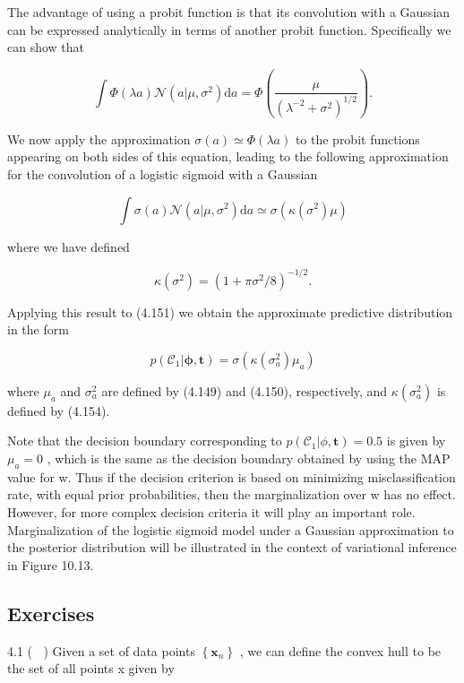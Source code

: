 \documentclass[
  10
]{article}
\begin{document}
The advantage of using a probit function is that its convolution with a
Gaussian can be expressed analytically in terms of another probit
function. Specifically we can show that

\[
\int \Phi (\lambda a) \mathcal {N} (a | \mu , \sigma^ {2}) \mathrm{d} a = \Phi \left(\frac {\mu}{(\lambda^ {- 2} + \sigma^ {2}) ^ {1 / 2}}\right).\tag{4.152}
\]

We now apply the approximation
\(\sigma ( a ) \simeq \Phi ( \lambda a )\) to the probit functions
appearing on both sides of this equation, leading to the following
approximation for the convolution of a logistic sigmoid with a Gaussian

\[
\int \sigma (a) \mathcal {N} (a | \mu , \sigma^ {2}) \mathrm{d} a \simeq \sigma (\kappa (\sigma^ {2}) \mu)\tag{4.153}
\]

where we have defined

\[
\kappa (\sigma^ {2}) = (1 + \pi \sigma^ {2} / 8) ^ {- 1 / 2}.\tag{4.154}
\]

Applying this result to (4.151) we obtain the approximate predictive
distribution in the form

\[
p (\mathcal {C} _ {1} | \boldsymbol {\phi}, \mathbf {t}) = \sigma \left(\kappa (\sigma_ {a} ^ {2}) \mu_ {a}\right)\tag{4.155}
\]

where \(\mu _ { a }\) and \(\sigma _ { a } ^ { 2 }\) are defined by
(4.149) and (4.150), respectively, and
\(\kappa ( \sigma _ { a } ^ { 2 } )\) is defined by (4.154).

Note that the decision boundary corresponding to
\(p ( \mathcal { C } _ { 1 } | \phi , \mathbf { t } ) = 0 . 5\) is given
by \(\mu _ { a } = 0\) , which is the same as the decision boundary
obtained by using the MAP value for w. Thus if the decision criterion is
based on minimizing misclassification rate, with equal prior
probabilities, then the marginalization over w has no effect. However,
for more complex decision criteria it will play an important role.
Marginalization of the logistic sigmoid model under a Gaussian
approximation to the posterior distribution will be illustrated in the
context of variational inference in Figure 10.13.

\subsection{Exercises}\label{exercises}

4.1 ( ) Given a set of data points
\(\left\{ \mathbf { x } _ { n } \right\}\) , we can define the convex
hull to be the set of all points x given by
\end{document}
